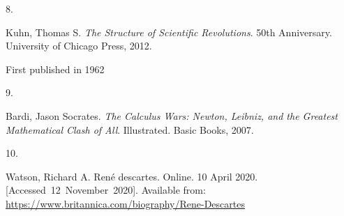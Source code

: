 \documentclass[
  a4paper,
]{article}
\newlength{\cslhangindent}
\newlength{\csllabelwidth}
\newlength{\cslentryspacingunit} %
\newenvironment{CSLReferences}[2] %
 {%
  \setlength{\parindent}{0pt}
  \ifodd #1
  \let\oldpar\par
  \def\par{\hangindent=\cslhangindent\oldpar}
  \fi
  \setlength{\parskip}{#2\cslentryspacingunit}
 }%
 {}
\newcommand{\CSLLeftMargin}[1]{\parbox[t]{\csllabelwidth}{#1}}
\newcommand{\CSLRightInline}[1]{\parbox[t]{\linewidth - \csllabelwidth}{#1}\break}
\begin{document}
\begin{CSLReferences}{0}{0}
\leavevmode{}%
\CSLLeftMargin{8. }%
\CSLRightInline{Kuhn, Thomas S. \emph{{The Structure of Scientific
Revolutions}}. 50th Anniversary. University of Chicago Press, 2012. }%
\CSLRightInline{First published in 1962}

\leavevmode{}%
\CSLLeftMargin{9. }%
\CSLRightInline{Bardi, Jason Socrates. \emph{{The Calculus Wars: Newton,
Leibniz, and the Greatest Mathematical Clash of All}}. Illustrated.
Basic Books, 2007. }

\leavevmode{}%
\CSLLeftMargin{10. }%
\CSLRightInline{Watson, Richard A. René descartes. Online. 10 April
2020. {[}Accessed~12~November~2020{]}. Available from:
\url{https://www.britannica.com/biography/Rene-Descartes}}

\end{CSLReferences}
\end{document}
